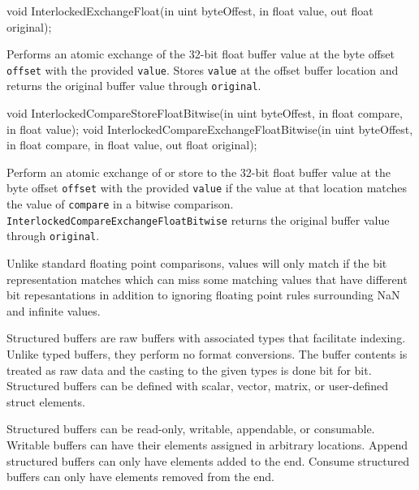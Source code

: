 \begin{HLSL}
   void InterlockedExchangeFloat(in uint byteOffest, in float value,
                                  out float original);
\end{HLSL}

Performs an atomic exchange of
the 32-bit float buffer value at the byte offset \texttt{offset} with the provided \texttt{value}.
Stores \texttt{value} at the offset buffer location
and returns the original buffer value through \texttt{original}.


\begin{HLSL}
  void InterlockedCompareStoreFloatBitwise(in uint byteOffest, in float compare,
                                            in float value);
  void InterlockedCompareExchangeFloatBitwise(in uint byteOffest,
                                               in float compare,
                                               in float value,
                                               out float original);
\end{HLSL}

Perform an atomic exchange of or store to
the 32-bit float buffer value at the byte offset \texttt{offset} with the provided \texttt{value}
if the value at that location matches the value of \texttt{compare} in a bitwise comparison.
\texttt{InterlockedCompareExchangeFloatBitwise} returns the original buffer value through \texttt{original}.

Unlike standard floating point comparisons, values will only match if the bit
representation matches which can miss some matching values that have different
bit repesantations in addition to ignoring floating point rules surrounding NaN
and infinite values.


Structured buffers are raw buffers with associated types that facilitate
indexing.
Unlike typed buffers, they perform no format conversions.
The buffer contents is treated as raw data and the casting to the given types
is done bit for bit.
Structured buffers can be defined with scalar, vector, matrix, or user-defined
struct elements.

Structured buffers can be read-only, writable, appendable, or consumable.
Writable buffers can have their elements assigned in arbitrary locations.
Append structured buffers can only have elements added to the end.
Consume structured buffers can only have elements removed from the end.

